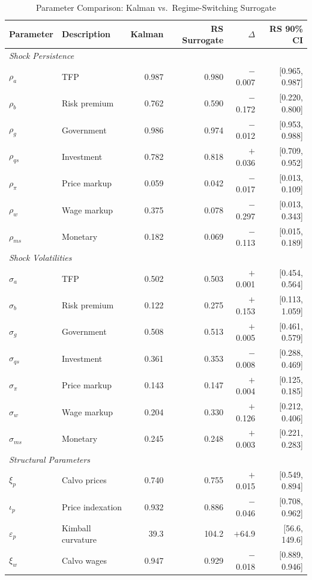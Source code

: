 \documentclass[12pt]{article}
\theoremstyle{plain}
\theoremstyle{definition}
\theoremstyle{remark}
\begin{document}
\begin{table}[htbp]
\centering
\caption{Parameter Comparison: Kalman vs.\ Regime-Switching Surrogate}
\label{tab:18param_switching_posterior}
\begin{tabular}{llrrrr}
\toprule
Parameter & Description & Kalman & RS Surrogate & $\Delta$ & RS 90\% CI \\
\midrule
\multicolumn{6}{l}{\textit{Shock Persistence}} \\
$\rho_a$ & TFP & 0.987 & 0.980 & $-$0.007 & [0.965, 0.987] \\
$\rho_b$ & Risk premium & 0.762 & 0.590 & $-$0.172 & [0.220, 0.800] \\
$\rho_g$ & Government & 0.986 & 0.974 & $-$0.012 & [0.953, 0.988] \\
$\rho_{qs}$ & Investment & 0.782 & 0.818 & $+$0.036 & [0.709, 0.952] \\
$\rho_{\pi}$ & Price markup & 0.059 & 0.042 & $-$0.017 & [0.013, 0.109] \\
$\rho_w$ & Wage markup & 0.375 & 0.078 & $-$0.297 & [0.013, 0.343] \\
$\rho_{ms}$ & Monetary & 0.182 & 0.069 & $-$0.113 & [0.015, 0.189] \\
\midrule
\multicolumn{6}{l}{\textit{Shock Volatilities}} \\
$\sigma_a$ & TFP & 0.502 & 0.503 & $+$0.001 & [0.454, 0.564] \\
$\sigma_b$ & Risk premium & 0.122 & 0.275 & $+$0.153 & [0.113, 1.059] \\
$\sigma_g$ & Government & 0.508 & 0.513 & $+$0.005 & [0.461, 0.579] \\
$\sigma_{qs}$ & Investment & 0.361 & 0.353 & $-$0.008 & [0.288, 0.469] \\
$\sigma_{\pi}$ & Price markup & 0.143 & 0.147 & $+$0.004 & [0.125, 0.185] \\
$\sigma_w$ & Wage markup & 0.204 & 0.330 & $+$0.126 & [0.212, 0.406] \\
$\sigma_{ms}$ & Monetary & 0.245 & 0.248 & $+$0.003 & [0.221, 0.283] \\
\midrule
\multicolumn{6}{l}{\textit{Structural Parameters}} \\
$\xi_p$ & Calvo prices & 0.740 & 0.755 & $+$0.015 & [0.549, 0.894] \\
$\iota_p$ & Price indexation & 0.932 & 0.886 & $-$0.046 & [0.708, 0.962] \\
$\varepsilon_p$ & Kimball curvature & 39.3 & 104.2 & $+$64.9 & [56.6, 149.6] \\
$\xi_w$ & Calvo wages & 0.947 & 0.929 & $-$0.018 & [0.889, 0.946] \\

\end{tabular}
\end{table}
\end{document}
